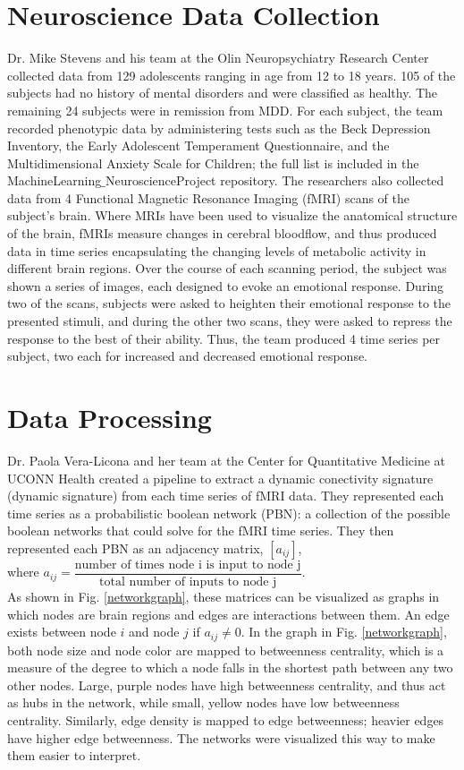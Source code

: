 \documentclass[12pt]{report}
\begin{document}
		\section{Neuroscience Data Collection}
		Dr. Mike Stevens and his team at the Olin Neuropsychiatry Research Center collected data from 129 adolescents ranging in age from 12 to 18 years. 105 of the subjects had no history of mental disorders and were classified as healthy. The remaining 24 subjects were in remission from MDD. For each subject, the team recorded phenotypic data by administering tests such as the Beck Depression Inventory, the Early Adolescent Temperament Questionnaire, and the Multidimensional Anxiety Scale for Children; the full list is included in the MachineLearning$\_$NeuroscienceProject repository. The researchers also collected data from 4 Functional Magnetic Resonance Imaging (fMRI) scans of the subject's brain. Where MRIs have been used to visualize the anatomical structure of the brain, fMRIs measure changes in cerebral bloodflow, and thus produced data in time series encapsulating the changing levels of metabolic activity in different brain regions. Over the course of each scanning period, the subject was shown a series of images, each designed to evoke an emotional response. During two of the scans, subjects were asked to heighten their emotional response to the presented stimuli, and during the other two scans, they were asked to repress the response to the best of their ability. Thus, the team produced 4 time series per subject, two each for increased and decreased emotional response.
	
		\section{Data Processing}
		Dr. Paola Vera-Licona and her team at the Center for Quantitative Medicine at UCONN Health created a pipeline to extract a dynamic conectivity signature (dynamic signature) from each time series of fMRI data. They represented each time series as a probabilistic boolean network (PBN): a collection of the possible boolean networks that could solve for the fMRI time series. They then represented each PBN as an adjacency matrix, $ [a_{ij}] $, \\
		where $ a_{ij} = \dfrac{\text{number of times node i is input to node j}}{\text{total number of inputs to node j}} $.\\
		 As shown in Fig. \ref{networkgraph}, these matrices can be visualized as graphs in which nodes are brain regions and edges are interactions between them. An edge exists between node $i$ and node $j$ if $a_{ij} \neq 0$. In the graph in Fig. \ref{networkgraph}, both node size and node color are mapped to betweenness centrality, which is a measure of the degree to which a node falls in the shortest path between any two other nodes. Large, purple nodes have high betweenness centrality, and thus act as hubs in the network, while small, yellow nodes have low betweenness centrality. Similarly, edge density is mapped to edge betweenness; heavier edges have higher edge betweenness. The networks were visualized this way to make them easier to interpret.
		
\end{document}
